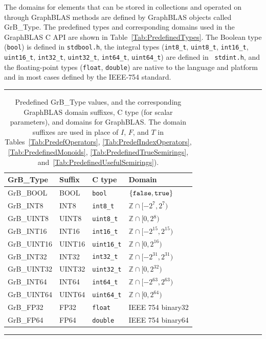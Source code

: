 The domains for elements that can be stored in collections and operated on
through GraphBLAS methods are defined by GraphBLAS objects called {\sf GrB\_Type}.
The predefined types and corresponding domains used in the GraphBLAS C API are
shown in Table~\ref{Tab:PredefinedTypes}.  The Boolean type ({\tt bool})
is defined in {\tt stdbool.h}, the integral types ({\tt int8\_t},
{\tt uint8\_t}, {\tt int16\_t}, {\tt uint16\_t}, {\tt int32\_t},
{\tt uint32\_t}, {\tt int64\_t}, {\tt uint64\_t}) are defined in {\tt
stdint.h}, and the floating-point types ({\tt float}, {\tt double}) are
native to the language and platform and in most cases defined by the 
IEEE-754 standard.

\begin{table}
\hrule
\begin{center}
\caption[Predefined {\sf GrB\_Type} values.]{Predefined {\sf GrB\_Type} values, and the corresponding GraphBLAS domain 
suffixes, C type (for scalar parameters), and domains for GraphBLAS.  The domain
suffixes are used in place of $I$, $F$, and $T$ in 
Tables~\ref{Tab:PredefOperators}, \ref{Tab:PredefIndexOperators}, 
\ref{Tab:PredefinedMonoids}, \ref{Tab:PredefinedTrueSemirings}, 
and~\ref{Tab:PredefinedUsefulSemirings}).}
\label{Tab:PredefinedTypes}
\label{Tab:PredefinedDomains}

\vspace{1\baselineskip}
\begin{tabular}{l|l|l|l}
{\sf GrB\_Type}   & Suffix       & C type          & Domain \\
\hline
{\sf GrB\_BOOL}   & {\sf BOOL}   & {\tt bool}      & $\{ {\tt false}, {\tt true} \}$  \\
{\sf GrB\_INT8}   & {\sf INT8}   & {\tt int8\_t}   & $\mathbb{Z} \cap [-2^{7},2^{7})$  \\
{\sf GrB\_UINT8}  & {\sf UINT8}  & {\tt uint8\_t}  & $\mathbb{Z} \cap [0,2{^8})$  \\
{\sf GrB\_INT16}  & {\sf INT16}  & {\tt int16\_t}  & $\mathbb{Z} \cap [-2^{15},2^{15})$ \\
{\sf GrB\_UINT16} & {\sf UINT16} & {\tt uint16\_t} & $\mathbb{Z} \cap [0,2^{16})$ \\
{\sf GrB\_INT32}  & {\sf INT32}  & {\tt int32\_t}  & $\mathbb{Z} \cap [-2^{31},2^{31})$ \\
{\sf GrB\_UINT32} & {\sf UINT32} & {\tt uint32\_t} & $\mathbb{Z} \cap [0,2^{32})$ \\
{\sf GrB\_INT64}  & {\sf INT64}  & {\tt int64\_t}  & $\mathbb{Z} \cap [-2^{63},2^{63})$ \\
{\sf GrB\_UINT64} & {\sf UINT64} & {\tt uint64\_t} & $\mathbb{Z} \cap [0,2^{64})$ \\
{\sf GrB\_FP32}   & {\sf FP32}   & {\tt float}     & IEEE 754 {\sf binary32}  \\
{\sf GrB\_FP64}   & {\sf FP64}   & {\tt double}    & IEEE 754 {\sf binary64}  
\end{tabular}
\end{center}
\hrule
\end{table}

